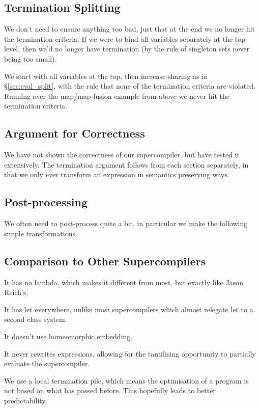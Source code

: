 \documentclass{sigplanconf}
\begin{document}
\subsection{Termination Splitting}
\label{sec:term_split}

We don't need to ensure anything too bad, just that at the end we no longer hit the termination criteria. If we were to bind all variables separately at the top-level, then we'd no longer have termination (by the rule of singleton sets never being too small).

We start with all variables at the top, then increase sharing as in \S\ref{sec:eval_split}, with the rule that none of the termination criteria are violated. Running over the map/map fusion example from above we never hit the termination criteria.

\subsection{Argument for Correctness}

We have not shown the correctness of our supercompiler, but have tested it extensively. The termination argument follows from each section separately, in that we only ever transform an expression in semantics preserving ways.

\subsection{Post-processing}

We often need to post-process quite a bit, in particular we make the following simple transformations.

\subsection{Comparison to Other Supercompilers}
\label{sec:comparison}

It has no lambda, which makes it different from most, but exactly like Jason Reich's.

It has let everywhere, unlike most supercompilers which almost relegate let to a second class system.

It doesn't use homeomorphic embedding.

It never rewrites expressions, allowing for the tantilising opportunity to partially evaluate the supercompiler.

We use a local termination pile, which means the optimisation of a program is not based on what has passed before. This hopefully leads to better predictability.
\end{document}
